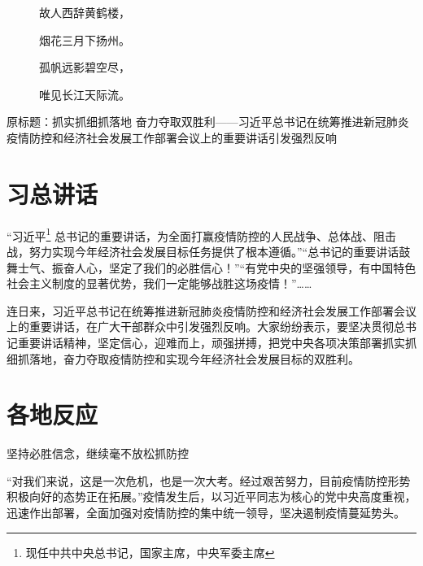 	\maketitle
	\tableofcontents
	\begin{description}
		\item[\qquad] 故人西辞黄鹤楼，
		\item[\qquad] 烟花三月下扬州。
		\item[\qquad] 孤帆远影碧空尽，
		\item[\qquad] 唯见长江天际流。
	\end{description}
	原标题：抓实抓细抓落地 奋力夺取双胜利——习近平总书记在统筹推进新冠肺炎疫情防控和经济社会发展工作部署会议上的重要讲话引发强烈反响
\section{习总讲话}
“习近平\footnote{现任中共中央总书记，国家主席，中央军委主席}%
总书记的重要讲话，为全面打赢疫情防控的人民战争、总体战、阻击战，努力实现今年经济社会发展目标任务提供了根本遵循。”“总书记的重要讲话鼓舞士气、振奋人心，坚定了我们的必胜信心！”“有党中央的坚强领导，有中国特色社会主义制度的显著优势，我们一定能够战胜这场疫情！”……

连日来，习近平总书记在统筹推进新冠肺炎疫情防控和经济社会发展工作部署会议上的重要讲话，在广大干部群众中引发强烈反响。大家纷纷表示，要坚决贯彻总书记重要讲话精神，坚定信心，迎难而上，顽强拼搏，把党中央各项决策部署抓实抓细抓落地，奋力夺取疫情防控和实现今年经济社会发展目标的双胜利。
\section{各地反应}
坚持必胜信念，继续毫不放松抓防控

“对我们来说，这是一次危机，也是一次大考。经过艰苦努力，目前疫情防控形势 积极向好的态势正在拓展。”疫情发生后，以习近平同志为核心的党中央高度重视，迅速作出部署，全面加强对疫情防控的集中统一领导，坚决遏制疫情蔓延势头。

